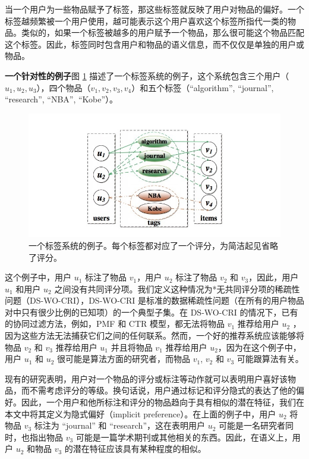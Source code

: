 当一个用户为一些物品赋予了标签，那这些标签就反映了用户对物品的偏好。一个标签越频繁被一个用户使用，越可能表示这个用户喜欢这个标签所指代一类的物品\cite{Zheng2011A}。类似的，如果一个标签被越多的用户赋予一个物品，那么很可能这个物品匹配这个标签。因此，标签同时包含用户和物品的语义信息，而不仅仅是单独的用户或物品。

\textbf{一个针对性的例子}\quad 图 \ref{fig:fig1} 描述了一个标签系统的例子，这个系统包含三个用户（$u_1, u_2, u_3​$），四个物品（$v_1,v_2,v_3,v_4​$）和五个标签（“algorithm”, “journal”, “research”, “NBA”, “Kobe”）。

\begin{figure}
\includegraphics[width=\linewidth]{images/figure1.jpg}
\caption{一个标签系统的例子。每个标签都对应了一个评分，为简洁起见省略了评分。}
\label{fig:fig1}
\end{figure}


这个例子中，用户 $u_1$ 标注了物品 $v_1$，用户 $u_2$ 标注了物品 $v_2$ 和 $ v_3$，因此，用户 $u_1$ 和用户 $u_2$ 之间没有共同评分项。我们定义这种情况为*无共同评分项的稀疏性问题（DS-WO-CRI），DS-WO-CRI 是标准的数据稀疏性问题（在所有的用户物品对中只有很少比例的已知项）的一个典型子集。在 DS-WO-CRI 的情况下，已有的协同过滤方法，例如，PMF 和 CTR 模型，都无法将物品 $v_1$ 推荐给用户 $u_2$ ，因为这些方法无法捕获它们之间的任何联系。然而，一个好的推荐系统应该能够将物品 $v_2$ 和 $v_3$ 推荐给用户 $u_1$ 并且将物品 $v_1$ 推荐给用户 $u_2$，因为在这个例子中，用户 $u_1$ 和 $u_2$ 很可能是算法方面的研究者，而物品 $v_1$, $v_2$ 和 $v_3$ 可能跟算法有关。

现有的研究表明，用户对一个物品的评分或标注等动作就可以表明用户喜好该物品，而不需考虑评分的等级\cite{Koren2008Factorization,Koren2009Matrix}。换句话说，用户通过标记和评分隐式的表达了他的偏好\cite{Koren2008Factorization}。因此，一个用户和他所标注和评分的物品趋向于具有相似的潜在特征，我们在本文中将其定义为隐式偏好（implicit preference）。在上面的例子中，用户 $u_2$ 将物品 $v_3$ 标注为 “journal” 和 “research”，这在表明用户 $u_2$ 可能是一名研究者同时，也指出物品 $v_3$ 可能是一篇学术期刊或其他相关的东西。因此，在语义上，用户 $u_2$ 和物品 $v_3$ 的潜在特征应该具有某种程度的相似。

